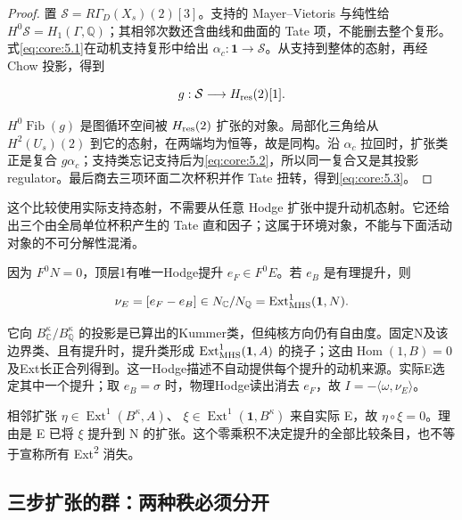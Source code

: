 \documentclass[11pt,a4paper,oneside]{ctexart}
\theoremstyle{cnplain}
\theoremstyle{definition}
\theoremstyle{remark}
\numberwithin{equation}{section}
\begin{document}
\begin{proof}

置 \(\mathcal S=R\Gamma_D(X_s)(2)[3]\)。支持的 Mayer--Vietoris 与纯性给 \(H^0\mathcal S=H_1(\Gamma,\mathbb Q)\)；其相邻次数还含曲线和曲面的 Tate 项，不能删去整个复形。式\eqref{eq:core:5.1}在动机支持复形中给出 \(\alpha_c:\mathbf1\to\mathcal S\)。从支持到整体的态射，再经 Chow 投影，得到

\begin{equation}
g:\mathcal S\longrightarrow H_{\rm res}(2)[1].
\end{equation}

\(H^0\operatorname{Fib}(g)\) 是图循环空间被 \(H_{\rm res}(2)\) 扩张的对象。局部化三角给从 \(H^2(U_s)(2)\) 到它的态射，在两端均为恒等，故是同构。沿 \(\alpha_c\) 拉回时，扩张类正是复合 \(g\alpha_c\)；支持类忘记支持后为\eqref{eq:core:5.2}，所以同一复合又是其投影 regulator。最后商去三项环面二次杯积并作 Tate 扭转，得到\eqref{eq:core:5.3}。

\end{proof}

这个比较使用实际支持态射，不需要从任意 Hodge 扩张中提升动机态射。它还给出三个由全局单位杯积产生的 Tate 直和因子；这属于环境对象，不能与下面活动对象的不可分解性混淆。

因为 \(F^0N=0\)，顶层1有唯一Hodge提升 \(e_F\in F^0E\)。若 \(e_B\) 是有理提升，则

\begin{equation}
\nu_E=[e_F-e_B]\in N_{\mathbb C}/N_{\mathbb Q}
       =\operatorname{Ext}^1_{\rm MHS}(\mathbf1,N).
\end{equation}

它向 \(B^\kappa_{\mathbb C}/B^\kappa_{\mathbb Q}\) 的投影是已算出的Kummer类，但纯核方向仍有自由度。固定N及该边界类、且有提升时，提升类形成 \(\operatorname{Ext}^1_{\rm MHS}(\mathbf1,A)\) 的挠子；这由\(\operatorname{Hom}(1,B)=0\)及Ext长正合列得到。这一Hodge描述不自动提供每个提升的动机来源。实际E选定其中一个提升；取 \(e_B=\sigma\) 时，物理Hodge读出消去 \(e_F\)，故 \(I=-\langle\omega,\nu_E\rangle\)。

相邻扩张 \(\eta\in\operatorname{Ext}^1(B^\kappa,A)\)、 \(\xi\in\operatorname{Ext}^1(\mathbf1,B^\kappa)\) 来自实际 E，故 \(\eta\circ\xi=0\)。理由是 E 已将 \(\xi \) 提升到 N 的扩张。这个零乘积不决定提升的全部比较条目，也不等于宣称所有 Ext\textsuperscript{2} 消失。


\subsection{三步扩张的群：两种秩必须分开}\label{sec:core:6}
\end{document}

